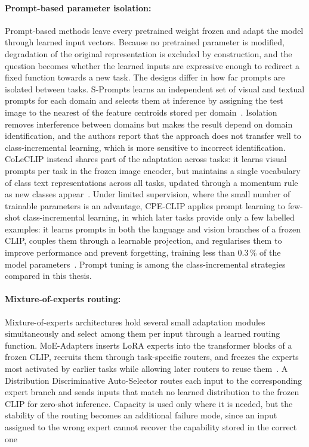 \paragraph{Prompt-based parameter isolation:} Prompt-based methods leave every pretrained weight frozen and adapt the model through learned input vectors. Because no pretrained parameter is modified, degradation of the original representation is excluded by construction, and the question becomes whether the learned inputs are expressive enough to redirect a fixed function towards a new task. The designs differ in how far prompts are isolated between tasks. S-Prompts learns an independent set of visual and textual prompts for each domain and selects them at inference by assigning the test image to the nearest of the feature centroids stored per domain~\cite{wang2023spromptslearningpretrainedtransformers}. Isolation removes interference between domains but makes the result depend on domain identification, and the authors report that the approach does not transfer well to class-incremental learning, which is more sensitive to incorrect identification. CoLeCLIP instead shares part of the adaptation across tasks: it learns visual prompts per task in the frozen image encoder, but maintains a single vocabulary of class text representations across all tasks, updated through a momentum rule as new classes appear~\cite{li2024coleclipopendomaincontinuallearning}. Under limited supervision, where the small number of trainable parameters is an advantage, CPE-CLIP applies prompt learning to few-shot class-incremental learning, in which later tasks provide only a few labelled examples: it learns prompts in both the language and vision branches of a frozen CLIP, couples them through a learnable projection, and regularises them to improve performance and prevent forgetting, training less than $0.3\,\%$ of the model parameters~\cite{D_Alessandro_2023}. Prompt tuning is among the class-incremental strategies compared in this thesis.

\paragraph{Mixture-of-experts routing:} Mixture-of-experts architectures hold several small adaptation modules simultaneously and select among them per input through a learned routing function. MoE-Adapters inserts LoRA experts into the transformer blocks of a frozen CLIP, recruits them through task-specific routers, and freezes the experts most activated by earlier tasks while allowing later routers to reuse them~\cite{yu2024boostingcontinuallearningvisionlanguage}. A Distribution Discriminative Auto-Selector routes each input to the corresponding expert branch and sends inputs that match no learned distribution to the frozen CLIP for zero-shot inference. Capacity is used only where it is needed, but the stability of the routing becomes an additional failure mode, since an input assigned to the wrong expert cannot recover the capability stored in the correct one


